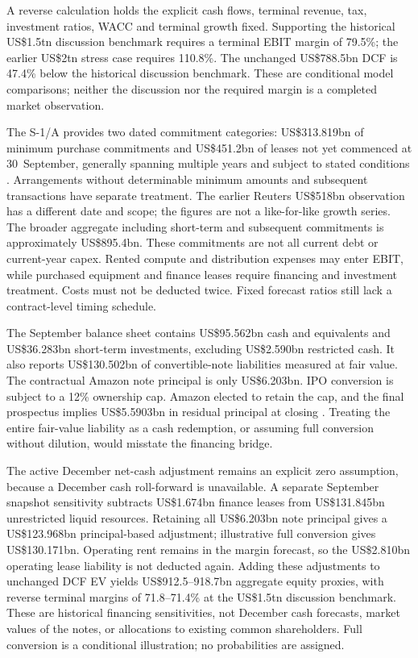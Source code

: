 \documentclass[11pt]{article}
\begin{document}
A reverse calculation holds the explicit cash flows, terminal revenue, tax, investment ratios, WACC and terminal growth fixed. Supporting the historical US\$1.5tn discussion benchmark requires a terminal EBIT margin of 79.5\%; the earlier US\$2tn stress case requires 110.8\%. The unchanged US\$788.5bn DCF is 47.4\% below the historical discussion benchmark. These are conditional model comparisons; neither the discussion nor the required margin is a completed market observation.

The S-1/A provides two dated commitment categories: US\$313.819bn of minimum purchase commitments and US\$451.2bn of leases not yet commenced at 30~September, generally spanning multiple years and subject to stated conditions \citep{anthropics1amend2026}. Arrangements without determinable minimum amounts and subsequent transactions have separate treatment. The earlier Reuters US\$518bn observation has a different date and scope; the figures are not a like-for-like growth series. The broader aggregate including short-term and subsequent commitments is approximately US\$895.4bn. These commitments are not all current debt or current-year capex. Rented compute and distribution expenses may enter EBIT, while purchased equipment and finance leases require financing and investment treatment. Costs must not be deducted twice. Fixed forecast ratios still lack a contract-level timing schedule.

The September balance sheet contains US\$95.562bn cash and equivalents and US\$36.283bn short-term investments, excluding US\$2.590bn restricted cash. It also reports US\$130.502bn of convertible-note liabilities measured at fair value. The contractual Amazon note principal is only US\$6.203bn. IPO conversion is subject to a 12\% ownership cap. Amazon elected to retain the cap, and the final prospectus implies US\$5.5903bn in residual principal at closing \citep{anthropicpricing2026}. Treating the entire fair-value liability as a cash redemption, or assuming full conversion without dilution, would misstate the financing bridge.

The active December net-cash adjustment remains an explicit zero assumption, because a December cash roll-forward is unavailable. A separate September snapshot sensitivity subtracts US\$1.674bn finance leases from US\$131.845bn unrestricted liquid resources. Retaining all US\$6.203bn note principal gives a US\$123.968bn principal-based adjustment; illustrative full conversion gives US\$130.171bn. Operating rent remains in the margin forecast, so the US\$2.810bn operating lease liability is not deducted again. Adding these adjustments to unchanged DCF EV yields US\$912.5--918.7bn aggregate equity proxies, with reverse terminal margins of 71.8--71.4\% at the US\$1.5tn discussion benchmark. These are historical financing sensitivities, not December cash forecasts, market values of the notes, or allocations to existing common shareholders. Full conversion is a conditional illustration; no probabilities are assigned.
\end{document}
